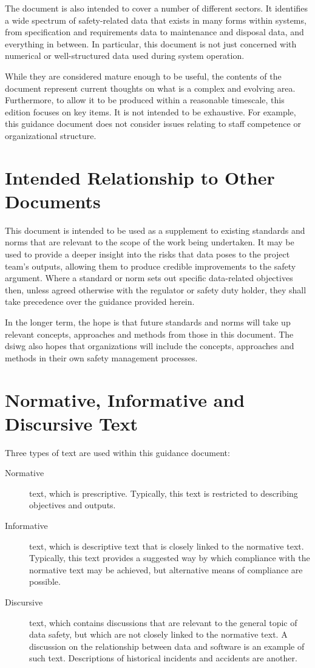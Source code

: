 The document is also intended to cover a number of different sectors. It identifies a wide spectrum of safety-related data that exists in many forms within systems, from specification and requirements data to maintenance and disposal data, and everything in between. In particular, this document is not just concerned with numerical or well-structured data used during system operation.

While they are considered mature enough to be useful, the contents of the document represent current thoughts on what is a complex and evolving area. Furthermore, to allow it to be produced within a reasonable timescale, this edition focuses on key items. It is not intended to be exhaustive. For example, this guidance document does not consider issues relating to staff competence or organizational structure.

\chapter{Intended Relationship to Other Documents}
This document is intended to be used as a supplement to existing standards and norms that are relevant to the scope of the work being undertaken. It may be used to provide a deeper insight into the risks that data poses to the project team's outputs, allowing them to produce credible improvements to the safety argument. Where a standard or norm sets out specific data-related objectives then, unless agreed otherwise with the regulator or safety duty holder, they shall take precedence over the guidance provided herein.

In the longer term, the hope is that future standards and norms will take up relevant concepts, approaches and methods from those in this document. The \gls{dsiwg} also hopes that organizations will include the concepts, approaches and methods in their own safety management processes.

\clearpage %
\chapter{Normative, Informative and Discursive Text}
Three types of text are used within this guidance document:
\begin{description}
	\item[Normative] text, which is prescriptive. Typically, this text is restricted to describing objectives and outputs.
	\item[Informative] text, which is descriptive text that is closely linked to the normative text. Typically, this text provides a suggested way by which compliance with the normative text may be achieved, but alternative means of compliance are possible.
	\item[Discursive] text, which contains discussions that are relevant to the general topic of data safety, but which are not closely linked to the normative text. A discussion on the relationship between data and software is an example of such text. Descriptions of historical incidents and accidents are another.
\end{description}

